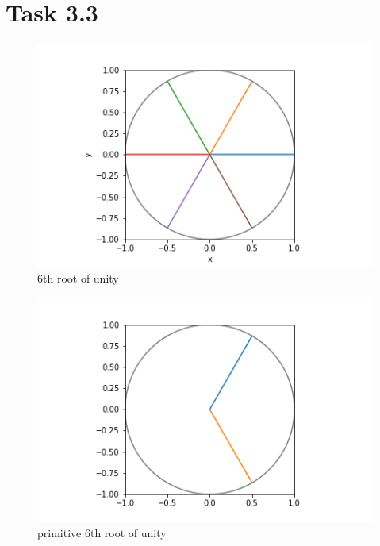 \documentclass[12pt]{article}
\begin{document}
 \section*{Task 3.3}
 \begin{figure}[h]
     \centering
     \includegraphics[width=1.1\textwidth]{6th_root_of_unity.png}
     \caption{6th root of unity}
     \label{abb}
 \end{figure}
 \begin{figure}[h]
      \centering
      \includegraphics[width=1.1\textwidth]{primitive_6th_root_of_unity.png}
      \caption{primitive 6th root of unity}
      \label{abb}
  \end{figure}
\end{document}
